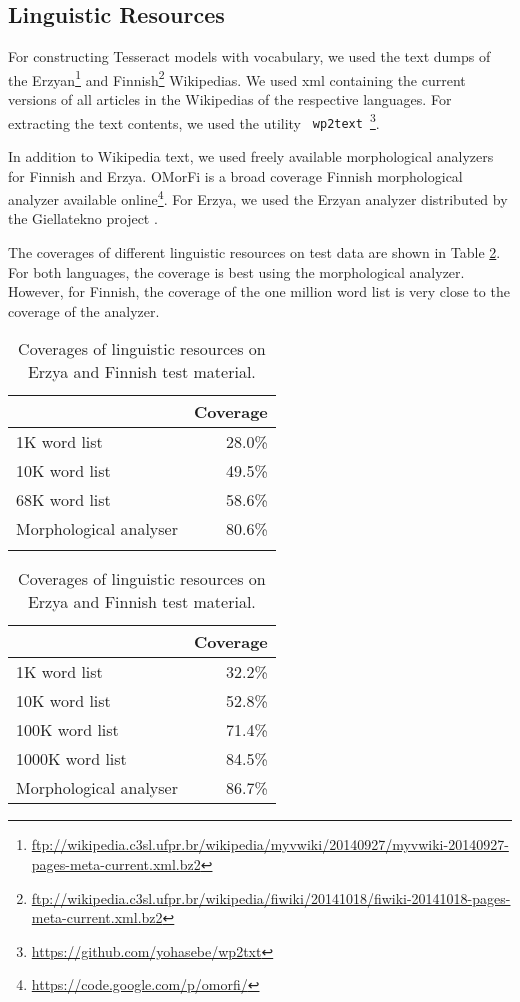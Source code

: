 \documentclass[b5paper]{article}
\begin{document}
\subsection{Linguistic Resources}
For constructing Tesseract models with vocabulary, we used the text
dumps of the
Erzyan\footnote{\url{ftp://wikipedia.c3sl.ufpr.br/wikipedia/myvwiki/20140927/myvwiki-20140927-pages-meta-current.xml.bz2}}
and
Finnish\footnote{\url{ftp://wikipedia.c3sl.ufpr.br/wikipedia/fiwiki/20141018/fiwiki-20141018-pages-meta-current.xml.bz2}}
Wikipedias. We used xml containing the current versions of all
articles in the Wikipedias of the respective languages. For extracting
the text contents, we used the utility {\tt
  wp2text}~\footnote{\url{https://github.com/yohasebe/wp2txt}}.

In addition to Wikipedia text, we used freely available morphological
analyzers for Finnish and Erzya. OMorFi \cite{pirinen11} is a broad
coverage Finnish morphological analyzer available
online\footnote{\url{https://code.google.com/p/omorfi/}}. For Erzya,
we used the Erzyan analyzer distributed by the Giellatekno project
\cite{moshagen14}.

The coverages of different linguistic resources on test data are shown
in Table \ref{fin-myv-coverage}. For both languages, the coverage is
best using the morphological analyzer. However, for Finnish, the
coverage of the one million word list is very close to the coverage of
the analyzer.

\begin{table}[!htb]
\begin{center}
\begin{tabular}{lr}
\hline 
                        & Coverage  \\
\hline 
1K word list            &   28.0\%  \\
10K word list           &   49.5\%  \\
68K word list           &   58.6\%  \\
Morphological analyser  &   80.6\%  \\
                        &
\end{tabular}
\quad
\begin{tabular}{lr}
\hline 
                        & Coverage \\
\hline 
1K word list            &  32.2\% \\
10K word list           &  52.8\% \\
100K word list          &  71.4\% \\
1000K word list         &  84.5\% \\
Morphological analyser  &  86.7\% 
\end{tabular}
\caption{Coverages of linguistic resources on Erzya and Finnish test material.}\label{fin-myv-coverage}
\end{center}
\end{table}
\end{document}
